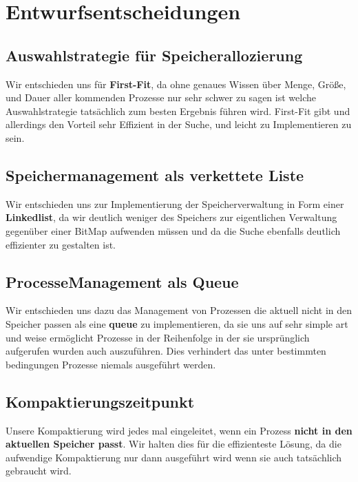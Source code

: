 \section{Entwurfsentscheidungen}
\subsection{Auswahlstrategie für Speicherallozierung}
Wir entschieden uns für \textbf{First-Fit}, da ohne genaues Wissen über Menge, Größe, und Dauer aller kommenden Prozesse nur sehr schwer zu sagen ist welche Auswahlstrategie tatsächlich zum besten Ergebnis führen wird. First-Fit gibt und allerdings den Vorteil sehr Effizient in der Suche, und leicht zu Implementieren zu sein.

\subsection{Speichermanagement als verkettete Liste}
Wir entschieden uns zur Implementierung der Speicherverwaltung in Form einer \textbf{Linkedlist}, da wir deutlich weniger des Speichers zur eigentlichen Verwaltung gegenüber einer BitMap aufwenden müssen und da die Suche ebenfalls deutlich effizienter zu gestalten ist.

\subsection{ProcesseManagement als Queue}
Wir entschieden uns dazu das Management von Prozessen die aktuell nicht in den Speicher passen als eine \textbf{queue} zu implementieren, da sie uns auf sehr simple art und weise ermöglicht Prozesse in der Reihenfolge in der sie ursprünglich aufgerufen wurden auch auszuführen. Dies verhindert das unter bestimmten bedingungen Prozesse niemals ausgeführt werden.

\subsection{Kompaktierungszeitpunkt}
Unsere Kompaktierung wird jedes mal eingeleitet, wenn ein Prozess \textbf{nicht in den aktuellen Speicher passt}. Wir halten dies für die effizienteste Lösung, da die aufwendige Kompaktierung nur dann ausgeführt wird wenn sie auch tatsächlich gebraucht wird.
